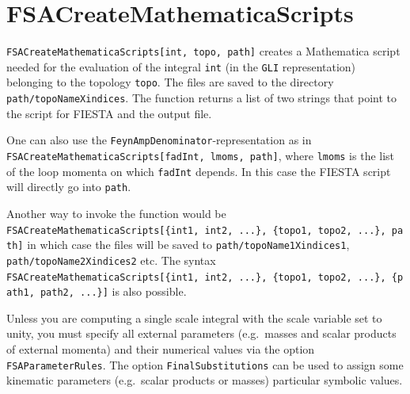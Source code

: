 \documentclass[../FeynHelpersManual.tex]{subfiles}
\begin{document}
\begin{Shaded}
\begin{Highlighting}[]
 
\end{Highlighting}
\end{Shaded}

\hypertarget{fsacreatemathematicascripts}{
\section{FSACreateMathematicaScripts}\label{fsacreatemathematicascripts}}

\texttt{FSACreateMathematicaScripts[\allowbreak{}int,\ \allowbreak{}topo,\ \allowbreak{}path]}
creates a Mathematica script needed for the evaluation of the integral
\texttt{int} (in the \texttt{GLI} representation) belonging to the
topology \texttt{topo}. The files are saved to the directory
\texttt{path/topoNameXindices}. The function returns a list of two
strings that point to the script for FIESTA and the output file.

One can also use the \texttt{FeynAmpDenominator}-representation as in
\texttt{FSACreateMathematicaScripts[\allowbreak{}fadInt,\ \allowbreak{}lmoms,\ \allowbreak{}path]},
where \texttt{lmoms} is the list of the loop momenta on which
\texttt{fadInt} depends. In this case the FIESTA script will directly go
into \texttt{path}.

Another way to invoke the function would be
\texttt{FSACreateMathematicaScripts[\allowbreak{}\{\allowbreak{}int1,\ \allowbreak{}int2,\ \allowbreak{}...\},\ \allowbreak{}\{\allowbreak{}topo1,\ \allowbreak{}topo2,\ \allowbreak{}...\},\ \allowbreak{}path]}
in which case the files will be saved to
\texttt{path/topoName1Xindices1}, \texttt{path/topoName2Xindices2} etc.
The syntax
\texttt{FSACreateMathematicaScripts[\allowbreak{}\{\allowbreak{}int1,\ \allowbreak{}int2,\ \allowbreak{}...\},\ \allowbreak{}\{\allowbreak{}topo1,\ \allowbreak{}topo2,\ \allowbreak{}...\},\ \allowbreak{}\{\allowbreak{}path1,\ \allowbreak{}path2,\ \allowbreak{}...\}]}
is also possible.

Unless you are computing a single scale integral with the scale variable
set to unity, you must specify all external parameters (e.g.~masses and
scalar products of external momenta) and their numerical values via the
option \texttt{FSAParameterRules}. The option
\texttt{FinalSubstitutions} can be used to assign some kinematic
parameters (e.g.~scalar products or masses) particular symbolic values.
\end{document}

